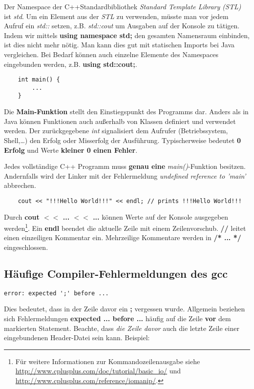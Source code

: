 Der Namespace der C++Standardbibliothek \emph{Standard Template Library (STL)} ist \emph{std}. 
Um ein Element aus der \emph{STL} zu verwenden, müsste man vor jedem Aufruf ein \emph{std::} setzen, z.B. \emph{std::cout} um Ausgaben auf der Konsole zu tätigen.
Indem wir mittels \textbf{using namespace std;} den gesamten Namensraum einbinden, ist dies nicht mehr nötig.
Man kann dies gut mit statischen Imports bei Java vergleichen.
Bei Bedarf können auch einzelne Elemente des Namespaces eingebunden werden, z.B. \textbf{using std::cout;}.

\begin{lstlisting}
	int main() {
		...
	}
\end{lstlisting}

Die \textbf{Main-Funktion} stellt den Einstiegspunkt des Programms dar.
Anders als in Java können Funktionen auch außerhalb von Klassen definiert und verwendet werden.
Der zurückgegebene \emph{int} signalisiert dem Aufrufer (Betriebssystem, Shell,\dots) den Erfolg oder Misserfolg der Ausführung.
Typischerweise bedeutet \textbf{0 Erfolg} und Werte \textbf{kleiner 0 einen Fehler}.

Jedes vollständige C++ Programm muss \textbf{genau eine }\emph{main()}-Funktion besitzen. Andernfalls wird der Linker mit der Fehlermeldung \emph{undefined reference to 'main'} abbrechen.

\begin{lstlisting}
	cout << "!!!Hello World!!!" << endl; // prints !!!Hello World!!!
\end{lstlisting}
Durch \textbf{cout $<<$ ... $<<$ ...} können Werte auf der Konsole ausgegeben werden\footnote{
Für weitere Informationen zur Kommandozeilenausgabe siehe \url{http://www.cplusplus.com/doc/tutorial/basic_io/} und \url{http://www.cplusplus.com/reference/iomanip/}.
}.
Ein \textbf{endl} beendet die aktuelle Zeile mit einem Zeilenvorschub.
\textbf{//} leitet einen einzeiligen Kommentar ein.
Mehrzeilige Kommentare werden in \textbf{/* ... */} eingeschlossen.

\subsection{Häufige Compiler-Fehlermeldungen des gcc}

\begin{verbatim}
error: expected ';' before ...
\end{verbatim}

Dies bedeutet, dass in der Zeile davor ein \textbf{;} vergessen wurde.
Allgemein beziehen sich Fehlermeldungen \textbf{expected ... before ...} häufig auf die Zeile \textbf{vor} dem markierten Statement.
Beachte, dass \emph{die Zeile davor} auch die letzte Zeile einer eingebundenen Header-Datei sein kann. Beispiel:

